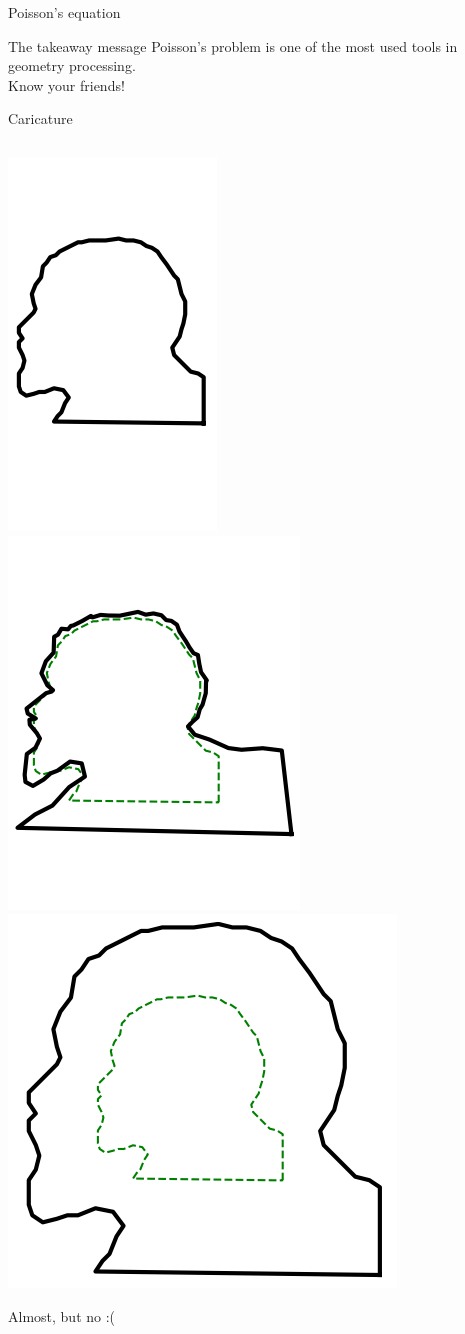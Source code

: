 \documentclass[UKenglish,aspectratio=169]{beamer}
\begin{document}
\begin{frame}
\inputminted[frame=single]{python}{listings/poisson-2d.py}
\end{frame}

\begin{frame}{Poisson's equation}
\vspace{10ex}
\begin{block}{The takeaway message}
Poisson's problem is one of the most used tools in geometry processing.\\
Know your friends!
\end{block}
\end{frame}




\begin{frame}{Caricature}
\inputminted[fontsize=\footnotesize,frame=single]{python}{listings/caricature.py}
\begin{minipage}{.55\linewidth}
    \includegraphics[height=.39\linewidth]{../manuscript/img/example_6_3_a.png}
\pause
    \includegraphics[height=.39\linewidth]{../manuscript/img/example_6_3_b.png}
\pause
    \includegraphics[height=.39\linewidth]{../manuscript/img/example_6_3_d.png}
\end{minipage}
\begin{minipage}{.44\linewidth}
Almost, but no :(
\pause
~\\


\end{minipage}
\end{frame}
\end{document}
